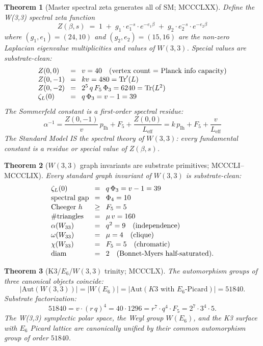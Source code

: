 \documentclass[11pt]{article}
\newtheorem{theorem}{Theorem}[section]
\begin{document}
\begin{theorem}[Master spectral zeta generates all of SM; MCCCLXX]\label{thm:spectral_master}
Define the W(3,3) spectral zeta function
\[
  Z(\beta, s) \;=\; 1 \;+\; g_1 \cdot e_1^{-s}\cdot e^{-e_1\beta}
                     \;+\; g_2 \cdot e_2^{-s}\cdot e^{-e_2\beta}
\]
where $(g_1, e_1) = (24, 10)$ and $(g_2, e_2) = (15, 16)$ are the
non-zero Laplacian eigenvalue multiplicities and values of $W(3,3)$.
Special values are substrate-clean:
\[\setlength{\arraycolsep}{4pt}\begin{array}{lcl}
  Z(0, 0)   &=& v = 40 \quad (\text{vertex count = Planck info capacity})\\
  Z(0, -1)  &=& kv = 480 = \text{Tr}'(L) \\
  Z(0, -2)  &=& 2^5\,q\,F_5\,\Phi_3 = 6240 = \text{Tr}(L^2) \\
  \zeta_L(0)&=& q\,\Phi_3 = v - 1 = 39
\end{array}\]
The Sommerfeld constant is a first-order spectral residue:
\[
  \alpha^{-1} = \frac{Z(0,-1)}{v}\,p_{\mathrm{Ih}} + F_5 + \frac{Z(0,0)}{L_{\mathrm{eff}}}
              = k\,p_{\mathrm{Ih}} + F_5 + \frac{v}{L_{\mathrm{eff}}}
\]
The Standard Model IS the spectral theory of $W(3,3)$: every fundamental
constant is a residue or special value of $Z(\beta, s)$.
\end{theorem}

\begin{theorem}[$W(3,3)$ graph invariants are substrate primitives; MCCCLI--MCCCLIX]\label{thm:w33_graph}
Every standard graph invariant of $W(3,3)$ is substrate-clean:
\[\setlength{\arraycolsep}{4pt}\begin{array}{lcl}
  \zeta_L(0)        &=& q\,\Phi_3 = v-1 = 39 \\[1pt]
  \text{spectral gap} &=& \Phi_4 = 10 \\[1pt]
  \text{Cheeger } h  &\geq& F_5 = 5 \\[1pt]
  \#\text{triangles} &=& \mu\,v = 160 \\[1pt]
  \alpha(W_{33})    &=& q^2 = 9 \quad (\text{independence})\\[1pt]
  \omega(W_{33})    &=& \mu = 4 \quad (\text{clique})\\[1pt]
  \chi(W_{33})      &=& F_5 = 5 \quad (\text{chromatic})\\[1pt]
  \mathrm{diam}     &=& 2 \quad (\text{Bonnet-Myers half-saturated}).
\end{array}\]
\end{theorem}

\begin{theorem}[K3/$E_6$/$W(3,3)$ trinity; MCCCLX]\label{thm:k3_e6_w33_trinity}
The automorphism groups of three canonical objects coincide:
\[
  |\mathrm{Aut}(W(3,3))| = |W(E_6)| = |\mathrm{Aut}(K3\text{ with } E_6\text{-Picard})| = 51840.
\]
Substrate factorization:
\[
  51840 = v \cdot (r\,q)^4 = 40 \cdot 1296
        = r^7 \cdot q^4 \cdot F_5
        = 2^7 \cdot 3^4 \cdot 5.
\]
The W(3,3) symplectic polar space, the Weyl group $W(E_6)$, and the
K3 surface with $E_6$ Picard lattice are canonically unified by their
common automorphism group of order $51840$.
\end{theorem}
\end{document}
